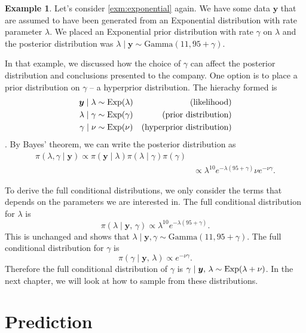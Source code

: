 \documentclass[
]{book}
\theoremstyle{definition}
\theoremstyle{definition}
\newtheorem{example}{Example}[chapter]
\theoremstyle{definition}
\theoremstyle{definition}
\theoremstyle{remark}
\begin{document}
\begin{example}
Let's consider \ref{exm:exponential} again. We have some data \(\boldsymbol{y}\) that are assumed to have been generated from an Exponential distribution with rate parameter \(\lambda\). We placed an Exponential prior distribution with rate \(\gamma\) on \(\lambda\) and the posterior distribution was \(\lambda \mid \boldsymbol{y} \sim \textrm{Gamma}(11, 95 + \gamma)\).

In that example, we discussed how the choice of \(\gamma\) can affect the posterior distribution and conclusions presented to the company. One option is to place a prior distribution on \(\gamma\) -- a hyperprior distribution. The hierachy formed is
\begin{align*}
\boldsymbol{y} \mid \lambda &\sim \hbox{Exp}(\lambda) & \textrm{(likelihood)} \\
\lambda \mid \gamma &\sim \hbox{Exp}(\gamma) & \textrm{(prior distribution)} \\
\gamma \mid \nu &\sim \hbox{Exp}(\nu) & \textrm{(hyperprior distribution)}  \\
\end{align*}.
By Bayes' theorem, we can write the posterior distribution as
\begin{align*}
\pi(\lambda, \gamma \mid \boldsymbol{y}) \propto \pi(\boldsymbol{y} \mid \lambda)\pi(\lambda \mid \gamma)\pi(\gamma)\\
&\propto \lambda^{10}e^{-\lambda(95 + \gamma)}\nu e^{-\nu\gamma}.
\end{align*}

To derive the full conditional distributions, we only consider the terms that depends on the parameters we are interested in. The full conditional distribution for \(\lambda\) is
\[
\pi(\lambda \mid \boldsymbol{y}, \,\gamma) \propto \lambda^{10}e^{-\lambda(95 + \gamma)}.
\]
This is unchanged and shows that \(\lambda \mid \boldsymbol{y}, \gamma \sim \textrm{Gamma}(11, 95 + \gamma)\). The full conditional distribution for \(\gamma\) is
\[
\pi(\gamma \mid \boldsymbol{y}, \,\lambda) \propto e^{-\nu\gamma}.
\]
Therefore the full conditional distribution of \(\gamma\) is \(\gamma \mid \boldsymbol{y}, \,\lambda \sim \hbox{Exp}(\lambda + \nu)\).
In the next chapter, we will look at how to sample from these distributions.
\end{example}

\hypertarget{prediction}{%
\section{Prediction}\label{prediction}}
\end{document}
